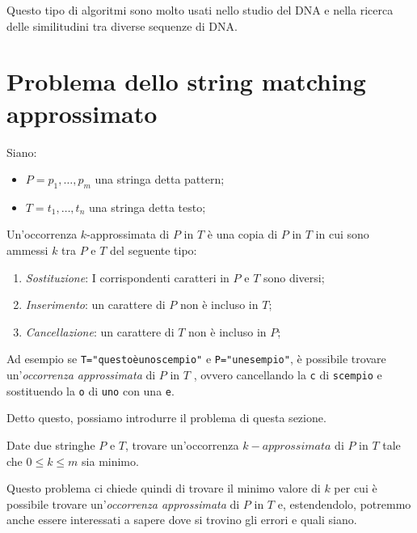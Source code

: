 \begin{note}
    Questo tipo di algoritmi sono molto usati nello studio del DNA e nella
    ricerca delle similitudini tra diverse sequenze di DNA.
\end{note}

\section{Problema dello string matching approssimato}
\begin{definition}
    Siano:
    \begin{itemize}
        \item $P=p_1,\dots,p_m$ una stringa detta pattern;
        \item $T=t_1,\dots,t_n$ una stringa detta testo;
    \end{itemize}
    Un'occorrenza $k$-approssimata di $P$ in $T$ è una copia di $P$ in $T$ in
    cui sono ammessi $k$  tra $P$ e $T$ del seguente tipo:
    \begin{enumerate}
        \item \emph{Sostituzione}: I corrispondenti caratteri in $P$ e $T$ sono
        diversi;
        \item \emph{Inserimento}: un carattere di $P$ non è incluso in $T$;
        \item \emph{Cancellazione}: un carattere di $T$ non è incluso in $P$;
    \end{enumerate}
\end{definition}

\noindent
Ad esempio se \texttt{T="questoèunoscempio"} e \texttt{P="unesempio"}, è possibile
trovare un'\emph{occorrenza approssimata} di $P$ in $T$ ,
ovvero cancellando la \texttt{c} di \texttt{scempio} e sostituendo la \texttt{o}
di \texttt{uno} con una \texttt{e}.

\bigskip\noindent
Detto questo, possiamo introdurre il problema di questa sezione.
\begin{problem}
    Date due stringhe $P$ e $T$, trovare un'occorrenza $k-approssimata$ di $P$
    in $T$ tale che $0\leq k\leq m$ sia minimo.
\end{problem}\noindent
Questo problema ci chiede quindi di trovare il minimo valore di $k$ per cui è
possibile trovare un'\emph{occorrenza approssimata} di $P$ in $T$ e, estendendolo,
potremmo anche essere interessati a sapere dove si trovino gli errori e quali
siano.

